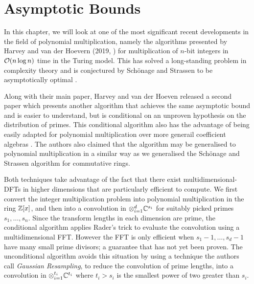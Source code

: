 \chapter{Asymptotic Bounds}\label{chp:asymptotic}


In this chapter, we will look at one of the most significant recent developments in the field of polynomial multiplication, namely the algorithms presented by Harvey and van der Hoevern (2019, \cite{nlogn}) for multiplication of $n$-bit integers in $\mathcal O(n \log n)$ time in the Turing model. This has solved a long-standing problem in complexity theory and is conjectured by Sch\"{o}nage and Strassen to be asymptotically optimal \cite{sch-str-optimality-int-mult}.

\medskip

Along with their main paper, Harvey and van der Hoeven released a second paper \cite{ffnlogn} which presents another algorithm that achieves the same asymptotic bound and is easier to understand, but is conditional on an unproven hypothesis on the distribution of primes. This conditional algorithm also has the advantage of being easily adapted for polynomial multiplication over more generail coefficient algebras \cite{ffnlogn}. The authors also claimed that the algorithm may be generalised to polynomial multiplication in a similar way as we generalised the Sch\"{o}nage and Strassen algorithm for commutative rings.

\medskip

Both techniques take advantage of the fact that there exist multidimensional-DFTs in higher dimensions that are particularly efficient to compute. We first convert the integer multiplication problem into polynomial multiplication in the ring ${\mathbb Z}[x]$, and then into a convolution in $\otimes_{i=1}^d {\mathbb C}^{s_i}$ for suitably picked primes $s_1, \ldots, s_n$. Since the transform lengths in each dimension are prime, the conditional algorithm applies Rader's trick to evaluate the convolution using a multidimensional FFT. However the FFT is only efficient when $s_1 - 1, \ldots, s_d - 1$ have many small prime divisors; a guarantee that has not yet been proven. The unconditional algorithm avoids this situation by using a technique the authors call \emph{Gaussian Resampling}, to reduce the convolution of prime lengths, into a convolution in $\otimes_{i=1}^{t_i} {\mathbb C}^{t_i}$ where $t_i > s_i$ is the smallest power of two greater than $s_i$.

